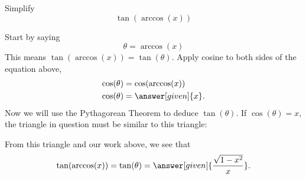 \documentclass{ximera}
\begin{document}
\begin{example}
  Simplify
  \[
  \tan(\arccos(x))
  \]
  \begin{explanation}
    Start by saying
    \[
    \theta = \arccos(x)
    \]
    This means $\tan(\arccos(x)) = \tan(\theta)$. Apply cosine to both
    sides of the equation above,
    \begin{align*}
      \cos(\theta) &= \cos(\arccos(x))\\
      \cos(\theta) &= \answer[given]{x}.
    \end{align*}
    Now we will use the Pythagorean Theorem to deduce
    $\tan(\theta)$. If $\cos(\theta)=x$, the triangle in question must
    be similar to this triangle:
    \begin{image}[2in]
    \end{image}
    From this triangle and our work above, we see that
    \[
    \tan(\arccos(x)) = \tan(\theta) = \answer[given]{\frac{\sqrt{1-x^2}}{x}}.
    \]
  \end{explanation}
\end{example}
\end{document}

